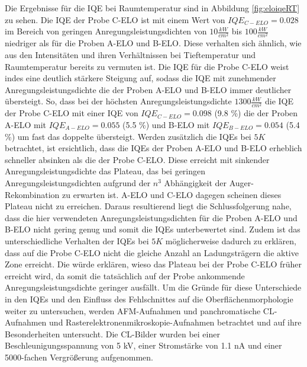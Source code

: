 \noindent 
Die Ergebnisse für die IQE bei Raumtemperatur sind in Abbildung \ref{fig:eloiqeRT} zu sehen. Die IQE der Probe C-ELO ist mit einem Wert von $IQE_{C-ELO} = 0.028$ im Bereich von geringen Anregungsleistungsdichten von $ 10 \frac{kW}{cm^2} $ bis $ 100 \frac{kW}{cm^2} $ niedriger als für die Proben A-ELO und B-ELO. Diese verhalten sich ähnlich, wie aus den Intensitäten und ihren Verhältnissen bei Tieftemperatur und Raumtemperatur bereits zu vermuten ist. 
\newline
Die IQE für die Probe C-ELO weist indes eine deutlich stärkere Steigung auf, sodass die IQE mit zunehmender Anregungsleistungsdichte die der Proben A-ELO und B-ELO immer deutlicher übersteigt. So, dass bei der höchsten Anregungsleistungsdichte $ 1300 \frac{kW}{cm^2} $ die IQE der Probe C-ELO mit einer IQE von $IQE_{C-ELO} = 0.098$ (9.8 \%) die der Proben A-ELO mit $IQE_{A-ELO} = 0.055$ (5.5 \%) und B-ELO mit $IQE_{B-ELO} = 0.054$ (5.4 \%) um fast das doppelte übersteigt. Werden zusätzlich die IQEs bei $5K$ betrachtet, ist ersichtlich, dass die IQEs der Proben A-ELO und B-ELO erheblich schneller absinken als die der Probe C-ELO. Diese erreicht mit sinkender Anregungsleistungsdichte das Plateau, das bei geringen Anregungsleistungsdichten aufgrund der $n^3$ Abhängigkeit der Auger-Rekombination zu erwarten ist.
A-ELO und C-ELO dagegen scheinen dieses Plateau nicht zu erreichen. Daraus resultierend liegt die Schlussfolgerung nahe, dass die hier verwendeten Anregungsleistungsdichten für die Proben A-ELO und B-ELO nicht gering genug und somit die IQEs unterbewertet sind. Zudem ist das unterschiedliche Verhalten der IQEs bei $5K$ möglicherweise dadurch zu erklären, dass auf die Probe C-ELO nicht die gleiche Anzahl an Ladungsträgern die aktive Zone erreicht. Die würde erklären, wieso das Plateau bei der Probe C-ELO früher erreicht wird, da somit die tatsächlich auf der Probe ankommende Anregungsleistungsdichte geringer ausfällt.  
\newline
Um die Gründe für diese Unterschiede in den IQEs und den Einfluss des Fehlschnittes auf die Oberflächenmorphologie weiter zu untersuchen, werden AFM-Aufnahmen und panchromatische CL-Aufnahmen und  Rasterelektronenmikroskopie-Aufnahmen  betrachtet und auf ihre Besonderheiten untersucht. Die CL-Bilder wurden bei einer Beschleunigungsspannung von 5 kV,
einer Stromstärke von 1.1 nA und einer 5000-fachen Vergrößerung aufgenommen.
\newline
